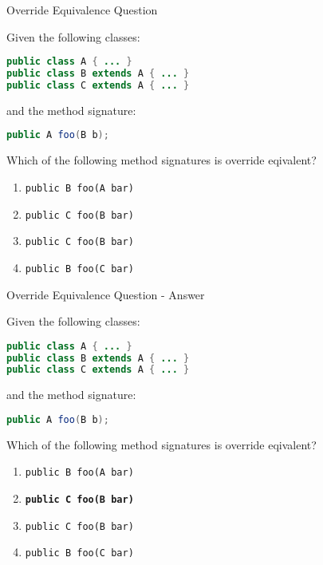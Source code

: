 \documentclass{beamer}
\begin{document}
\begin{frame}[fragile]{Override Equivalence Question}

Given the following classes:

\begin{lstlisting}[language=Java]
public class A { ... }
public class B extends A { ... }
public class C extends A { ... }
\end{lstlisting}

and the method signature:

\begin{lstlisting}[language=Java]
public A foo(B b);
\end{lstlisting}

Which of the following method signatures is override eqivalent?

\begin{enumerate}
\item {\tt public B foo(A bar)}
\item {\tt public C foo(B bar)}
\item {\tt public C foo(B bar)}
\item {\tt public B foo(C bar)}
\end{enumerate}


\end{frame}

\begin{frame}[fragile]{Override Equivalence Question - Answer}

Given the following classes:

\begin{lstlisting}[language=Java]
public class A { ... }
public class B extends A { ... }
public class C extends A { ... }
\end{lstlisting}

and the method signature:

\begin{lstlisting}[language=Java]
public A foo(B b);
\end{lstlisting}

Which of the following method signatures is override eqivalent?

\begin{enumerate}
\item {\tt public B foo(A bar)}
\item {\tt {\bf public C foo(B bar)}}
\item {\tt public C foo(B bar)}
\item {\tt public B foo(C bar)}
\end{enumerate}


\end{frame}
\end{document}

